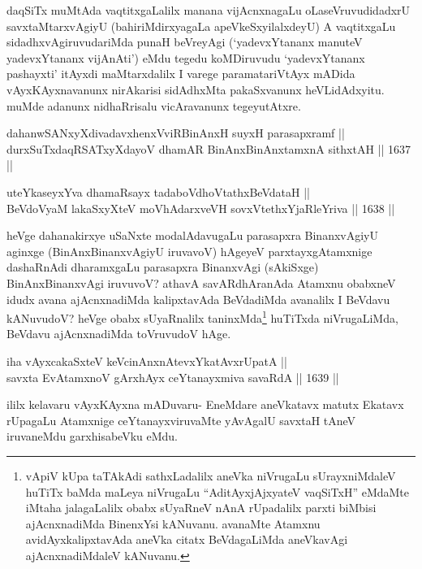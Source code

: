 \begin{artha}
daqSiTx muMtAda vaqtitxgaLalilx manana vijAcnxnagaLu oLaseVruvudidadxrU savxtaMtarxvAgiyU (bahiriMdirxyagaLa apeVkeSxyilalxdeyU) A vaqtitxgaLu sidadhxvAgiruvudariMda punaH beVreyAgi (`yadevxYtananx manuteV yadevxYtananx vijAnAti') eMdu tegedu koMDiruvudu `yadevxYtananx pashayxti' itAyxdi maMtarxdalilx I varege paramatariVtAyx mADida vAyxKAyxnavanunx nirAkarisi sidAdhxMta pakaSxvanunx heVLidAdxyitu. muMde adanunx nidhaRrisalu vicAravanunx tegeyutAtxre.
\end{artha}

\begin{shl}
dahanwSANxyXdivadavxhenxVviRBinAnxH suyxH parasapxramf || \\
durxSuTxdaqRSATxyXdayoV dhamAR BinAnxBinAnxtamxnA sithxtAH \hfill || 1637 ||  
\end{shl}

\begin{shl}
uteYkaseyxYva dhamaRsayx tadaboVdhoVtathxBeVdataH || \\
BeVdoV\s yaM lakaSxyXteV moVhAdarxveVH sovxVtethxYjaRleYriva \hfill || 1638 ||  
\end{shl}

\begin{artha}
heVge dahanakirxye uSaNxte modalAdavugaLu parasapxra BinanxvAgiyU aginxge (BinAnxBinanxvAgiyU iruvavoV) hAgeyeV parxtayxgAtamxnige dashaRnAdi dharamxgaLu parasapxra BinanxvAgi (sAkiSxge) BinAnxBinanxvAgi iruvuvoV? athavA savARdhAranAda Atamxnu obabxneV idudx avana ajAcnxnadiMda kalipxtavAda BeVdadiMda avanalilx I BeVdavu kANuvudoV? heVge obabx sUyaRnalilx taninxMda\footnote{vApiV kUpa taTAkAdi sathxLadalilx aneVka niVrugaLu sUrayxniMdaleV huTiTx baMda maLeya niVrugaLu ``AditAyxjAjxyateV vaqSiTxH'' eMdaMte iMtaha jalagaLalilx obabx sUyaRneV nAnA rUpadalilx parxti biMbisi ajAcnxnadiMda BinenxYsi kANuvanu. avanaMte Atamxnu avidAyxkalipxtavAda aneVka citatx BeVdagaLiMda aneVkavAgi ajAcnxnadiMdaleV kANuvanu.} huTiTxda niVrugaLiMda, BeVdavu ajAcnxnadiMda toVruvudoV hAge.
\end{artha}


\begin{shl}
iha vAyxcakaSxteV keVcinAnxnAtevxYkatAvxrUpatA || \\
savxta EvA\s \s tamxnoV gArxhAyx ceYtanayxmiva savaRdA \hfill || 1639 ||  
\end{shl}

\begin{artha}
ililx kelavaru vAyxKAyxna mADuvaru- EneMdare aneVkatavx matutx Ekatavx rUpagaLu Atamxnige ceYtanayxviruvaMte yAvAgalU savxtaH tAneV iruvaneMdu garxhisabeVku eMdu.
\end{artha}

